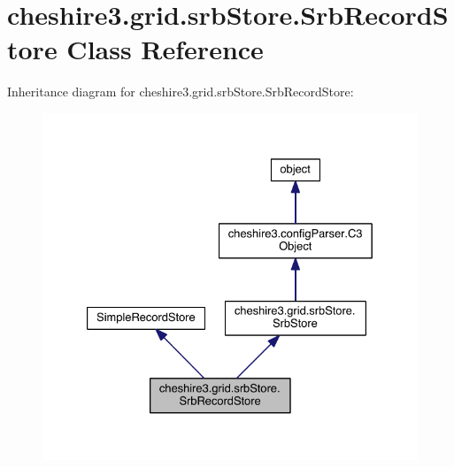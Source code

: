 \hypertarget{classcheshire3_1_1grid_1_1srb_store_1_1_srb_record_store}{\section{cheshire3.\-grid.\-srb\-Store.\-Srb\-Record\-Store Class Reference}
\label{classcheshire3_1_1grid_1_1srb_store_1_1_srb_record_store}
}


Inheritance diagram for cheshire3.\-grid.\-srb\-Store.\-Srb\-Record\-Store\-:
\nopagebreak
\begin{figure}[H]
\begin{center}
\leavevmode
\includegraphics[width=329pt]{classcheshire3_1_1grid_1_1srb_store_1_1_srb_record_store__inherit__graph}
\end{center}
\end{figure}


